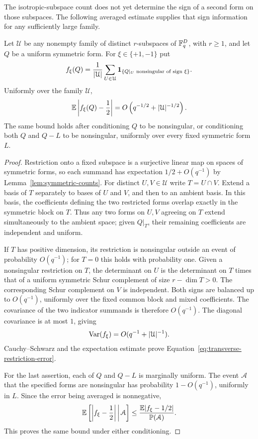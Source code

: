 The isotropic-subspace count does not yet determine the sign of a
second form on those subspaces. The following averaged estimate
supplies that sign information for any sufficiently large family.

\begin{lemma}
\label{lem:transverse-restrictions}
Let $\mathcal U$ be any nonempty family of distinct $r$-subspaces of
$\mathbb F_q^D$, with $r\geq1$, and let $Q$ be a uniform symmetric form.
For $\xi\in\{+1,-1\}$ put
\[
 f_\xi(Q)=\frac1{|\mathcal U|}\sum_{U\in\mathcal U}
 \mathbf 1_{\{Q|_U\text{ nonsingular of sign }\xi\}}.
\]
Uniformly over the family $\mathcal U$,
\begin{equation}
\label{eq:transverse-restriction-error}
 \mathbb E\left|f_\xi(Q)-\frac12\right|
 =O\left(q^{-1/2}+|\mathcal U|^{-1/2}\right).
\end{equation}
The same bound holds after conditioning $Q$ to be nonsingular, or
conditioning both $Q$ and $Q-L$ to be nonsingular, uniformly over every
fixed symmetric form $L$.
\end{lemma}

\begin{proof}
Restriction onto a fixed subspace is a surjective linear map on spaces
of symmetric forms, so each summand has expectation
$1/2+O(q^{-1})$ by Lemma~\ref{lem:symmetric-counts}.
For distinct $U,V\in\mathcal U$ write $T=U\cap V$. Extend a basis of
$T$ separately to bases of $U$ and $V$, and then to an ambient basis.
In this basis, the coefficients defining the two restricted forms
overlap exactly in the symmetric block on $T$. Thus any two forms on
$U,V$ agreeing on $T$ extend simultaneously to the ambient space;
given $Q|_T$, their remaining coefficients are independent and uniform.

If $T$ has positive dimension, its restriction is nonsingular outside
an event of probability $O(q^{-1})$; for $T=0$ this holds with probability
one. Given a nonsingular restriction on $T$, the determinant on $U$
is the determinant on $T$ times that of a uniform symmetric Schur
complement of size $r-\dim T>0$. The corresponding Schur complement
on $V$ is independent. Both signs are balanced up to $O(q^{-1})$,
uniformly over the fixed common block and mixed coefficients. The
covariance of the two indicator summands is therefore $O(q^{-1})$.
The diagonal covariance is at most $1$, giving
\[
 \operatorname{Var}(f_\xi)=O(q^{-1}+|\mathcal U|^{-1}).
\]
Cauchy--Schwarz and the expectation estimate prove
Equation~\eqref{eq:transverse-restriction-error}.

For the last assertion, each of $Q$ and $Q-L$ is marginally uniform.
The event $\mathcal A$ that the specified forms are nonsingular has
probability $1-O(q^{-1})$, uniformly in $L$. Since the error being
averaged is nonnegative,
\[
 \mathbb E\left[\left|f_\xi-\frac12\right|\,\middle|\,\mathcal A\right]
 \leq \frac{\mathbb E|f_\xi-1/2|}{\mathbb P(\mathcal A)}.
\]
This proves the same bound under either conditioning.
\end{proof}

